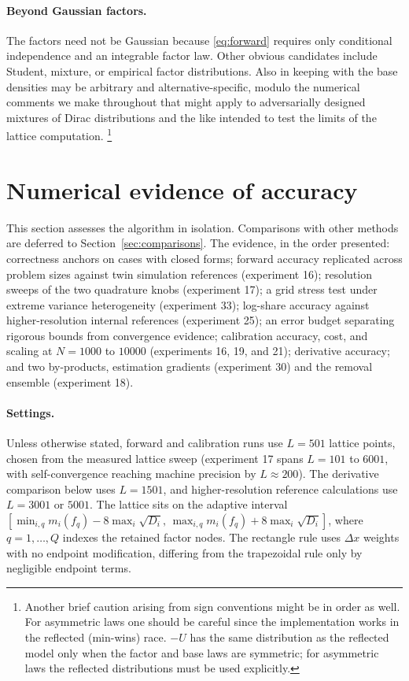 \documentclass[12pt]{article}
\theoremstyle{remark}
\begin{document}
\paragraph{Beyond Gaussian factors.} The factors need not be Gaussian because \eqref{eq:forward} requires only
conditional independence and an integrable factor law. Other obvious candidates include Student, mixture,
or empirical factor distributions. Also in keeping with \citet{cotton2021} the base densities may be arbitrary and alternative-specific, modulo
the numerical comments we make throughout that might apply to adversarially designed mixtures of Dirac distributions and the like intended to test the 
limits of the lattice computation. \footnote{Another brief caution arising from sign conventions might be in order as well. For asymmetric laws one should be careful since 
the implementation works in the reflected (min-wins)
race. $-U$ has the same distribution as the reflected model only when the
factor and base laws are symmetric; for asymmetric laws the reflected
distributions must be used explicitly.}

\section{Numerical evidence of accuracy}\label{sec:benchmark}

This section assesses the algorithm in isolation. Comparisons with
other methods are deferred to Section~\ref{sec:comparisons}. The
evidence, in the order presented: correctness anchors on cases with
closed forms; forward accuracy replicated across problem sizes against
twin simulation references (experiment 16); resolution sweeps of the two
quadrature knobs (experiment 17); a grid stress test under extreme
variance heterogeneity (experiment 33); log-share accuracy against
higher-resolution internal references (experiment 25); an error budget separating
rigorous bounds from convergence evidence; calibration accuracy, cost,
and scaling at $N = 1000$ to $10000$ (experiments 16, 19, and 21);
derivative accuracy; and two by-products, estimation gradients
(experiment 30) and the removal ensemble (experiment 18).

\paragraph{Settings.} Unless otherwise stated, forward and
calibration runs use $L = 501$ lattice points, chosen from the measured
lattice sweep (experiment 17 spans $L = 101$ to $6001$, with
self-convergence reaching machine precision by $L \approx 200$). The
derivative comparison below uses $L = 1501$, and higher-resolution
reference calculations use $L = 3001$ or $5001$. The lattice sits on
the adaptive interval
$[\min_{i,q} m_i(f_q) - 8\max_i\sqrt{D_i},\,
\max_{i,q} m_i(f_q) + 8\max_i\sqrt{D_i}]$, where $q = 1, \dots, Q$ indexes
the retained factor nodes. The rectangle rule uses $\Delta x$ weights
with no endpoint modification, differing from the trapezoidal rule only
by negligible endpoint terms.
\end{document}
